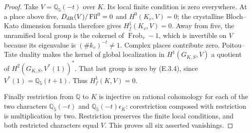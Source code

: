 \begin{proof}
Take \(V=\mathbb Q_5(-t)\) over \(K\). Its local finite
condition is zero everywhere. At a place above five,
\(D_{\rm dR}(V)/\operatorname{Fil}^0=0\) and
\(H^0(K_v,V)=0\); the crystalline Bloch--Kato dimension
formula \cite[Corollary 3.8.4]{DE_BlochKato1990} therefore gives \(H_f^1(K_v,V)=0\). Away from five,
the unramified local group is the cokernel of
\(\operatorname{Frob}_v-1\), which is invertible on \(V\)
because its eigenvalue is \((\#k_v)^{-t}\ne1\).
Complex places contribute zero. Poitou--Tate duality makes
the kernel of global localization in \(H^1(G_{K,S},V)\)
a quotient of \(H^2(G_{K,S},V^*(1))^*\). That last group
is zero by (E.3.4), since \(V^*(1)=\mathbb Q_5(t+1)\).
Thus \(H_f^1(K,V)=0\).

Finally restriction from \(\mathbb Q\) to \(K\) is injective
on rational cohomology for each of the two characters
\(\mathbb Q_5(-t)\) and \(\mathbb Q_5(-t)\epsilon_K\):
corestriction composed with restriction is multiplication
by two. Restriction preserves the finite local conditions,
and both restricted characters equal \(V\). This proves
all six asserted vanishings.
\end{proof}


